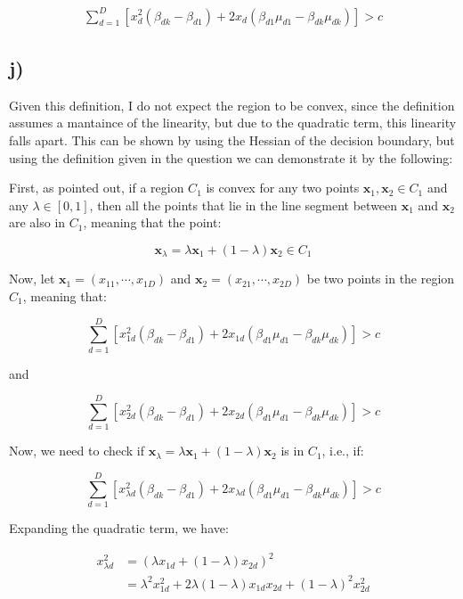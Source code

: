 \documentclass[12pt,a4paper,oneside]{paper}
\begin{document}
\begin{align*}
    \sum_{d=1}^{D} \left[ x_d^2 (\beta_{dk} - \beta_{d1}) + 2 x_d (\beta_{d1} \mu_{d1} - \beta_{dk} \mu_{dk})\right] > c
\end{align*}

\newpage
\subsection*{j)}

Given this definition, I do not expect the region to be convex, since the definition assumes a mantaince of the linearity, 
but due to the quadratic term, this linearity falls apart. This can be shown by using the Hessian of the decision boundary,
but using the definition given in the question we can demonstrate it by the following: 

First, as pointed out, if a region $C_1$ is convex for any two points $\bm{x}_1, \bm{x}_2 \in C_1$ and any $\lambda \in [0, 1]$, then all the points that
lie in the line segment between $\bm{x}_1$ and $\bm{x}_2$ are also in $C_1$, meaning that the point: 

$$
\bm{x}_{\lambda} = \lambda \bm{x}_1 + (1 - \lambda) \bm{x}_2 \in C_1
$$

Now, let $\bm{x}_1 = (x_{11}, \cdots, x_{1D})$ and $\bm{x}_2 = (x_{21}, \cdots ,x_{2D})$ be two points in the region $C_1$, meaning that:

$$
\sum_{d=1}^{D} \left[ x_{1d}^2 (\beta_{dk} - \beta_{d1}) + 2 x_{1d} (\beta_{d1} \mu_{d1} - \beta_{dk} \mu_{dk})\right] > c
$$

and 

$$
\sum_{d=1}^{D} \left[ x_{2d}^2 (\beta_{dk} - \beta_{d1}) + 2 x_{2d} (\beta_{d1} \mu_{d1} - \beta_{dk} \mu_{dk})\right] > c
$$

Now, we need to check if $\bm{x}_{\lambda} = \lambda \bm{x}_1 + (1 - \lambda) \bm{x}_2$ is in $C_1$, i.e., if:

$$
\sum_{d=1}^{D} \left[ x_{\lambda d}^2 (\beta_{dk} - \beta_{d1}) + 2 x_{\lambda d} (\beta_{d1} \mu_{d1} - \beta_{dk} \mu_{dk})\right] > c
$$

Expanding the quadratic term, we have:

\begin{align*}
    x_{\lambda d}^2 &= \left(\lambda x_{1d} + (1 - \lambda) x_{2d}\right)^2 \\
    &= \lambda^2 x_{1d}^2 + 2 \lambda (1 - \lambda) x_{1d} x_{2d} + (1 - \lambda)^2 x_{2d}^2
\end{align*}
\end{document}
